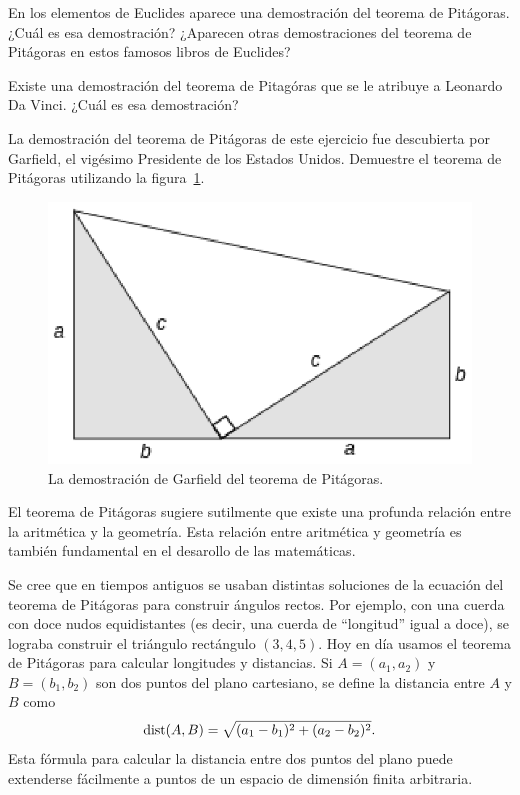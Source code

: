 \begin{exercise}
	En los elementos de Euclides aparece una demostración del teorema de
	Pitágoras. ¿Cuál es esa demostración? ¿Aparecen otras demostraciones del
	teorema de Pitágoras en estos famosos libros de Euclides?
\end{exercise}

\begin{exercise}
	Existe una demostración del teorema de Pitagóras que se le atribuye a
	Leonardo Da Vinci. ¿Cuál es esa demostración?
\end{exercise}

\begin{exercise}
	La demostración del teorema de Pitágoras de este ejercicio fue descubierta
	por Garfield, el vigésimo Presidente de los Estados Unidos.  Demuestre el
	teorema de Pitágoras utilizando la figura~\ref{fig:garfield}.
	\begin{figure}[h]
		\centering
		\includegraphics[scale=0.5]{images/garfield}
		\caption{La demostración de Garfield del teorema de Pitágoras.}
		\label{fig:garfield}
	\end{figure}
\end{exercise}


El teorema de Pitágoras sugiere sutilmente que existe una profunda relación
entre la aritmética y la geometría. Esta relación entre aritmética y geometría
es también fundamental en el desarollo de las matemáticas. 

Se cree que en tiempos antiguos se usaban distintas soluciones de la ecuación
del teorema de Pitágoras para construir ángulos rectos.  Por ejemplo, con una
cuerda con doce nudos equidistantes (es decir, una cuerda de ``longitud'' igual
a doce), se lograba construir el triángulo rectángulo $(3,4,5)$.  Hoy en día
usamos el teorema de Pitágoras para calcular longitudes y distancias.  Si
$A=(a_1,a_2)$ y $B=(b_1,b_2)$ son dos puntos del plano cartesiano, se define la
distancia entre $A$ y $B$ como 
\[
	\mathrm{dist}(A,B)=\sqrt{(a_1-b_1)^2+(a_2-b_2)^2}.
\]
Esta fórmula para calcular la distancia entre dos puntos del plano puede
extenderse fácilmente a puntos de un espacio de dimensión finita arbitraria. 

